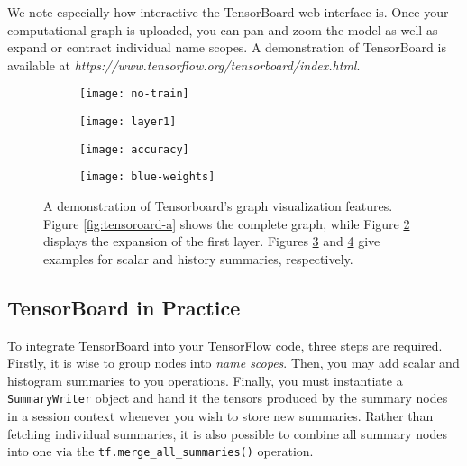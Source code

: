 We note especially how interactive the TensorBoard web interface is. Once your
computational graph is uploaded, you can pan and zoom the model as well as
expand or contract individual name scopes. A demonstration of TensorBoard is
available at \emph{https://www.tensorflow.org/tensorboard/index.html}.

\begin{figure}[h!]
  \centering
  \begin{subfigure}[h]{0.5\textwidth}
    \centering
    \texttt{[image: no-train]}
   \caption{}
   \label{fig:tensorboard-a}
  \end{subfigure}

  \vspace{0.3cm}

  \begin{subfigure}[h]{0.5\textwidth}
    \centering
    \texttt{[image: layer1]}
    \caption{}
    \label{fig:tensorboard-b}
  \end{subfigure}

  \vspace{0.3cm}

  \begin{subfigure}[h]{0.2\textwidth}
    \centering
    \texttt{[image: accuracy]}
    \caption{}
    \label{fig:tensorboard-c}
  \end{subfigure}
  \begin{subfigure}[h]{0.2\textwidth}
    \centering
    \texttt{[image: blue-weights]}
    \caption{}
    \label{fig:tensorboard-d}
  \end{subfigure}
  \caption{A demonstration of Tensorboard's graph visualization features. Figure
    \ref{fig:tensoroard-a} shows the complete graph, while Figure
    \ref{fig:tensorboard-b} displays the expansion of the first layer. Figures
    \ref{fig:tensorboard-c} and \ref{fig:tensorboard-d} give examples for scalar
    and history summaries, respectively.}
  \label{fig:tensorboard}
\end{figure}

\subsection{TensorBoard in Practice}\label{sec:visual-code}

To integrate TensorBoard into your TensorFlow code, three steps are
required. Firstly, it is wise to group nodes into \emph{name scopes}. Then, you
may add scalar and histogram summaries to you operations. Finally, you must
instantiate a \texttt{SummaryWriter} object and hand it the tensors produced by
the summary nodes in a session context whenever you wish to store new
summaries. Rather than fetching individual summaries, it is also possible to
combine all summary nodes into one via the \texttt{tf.merge\_all\_summaries()}
operation.



